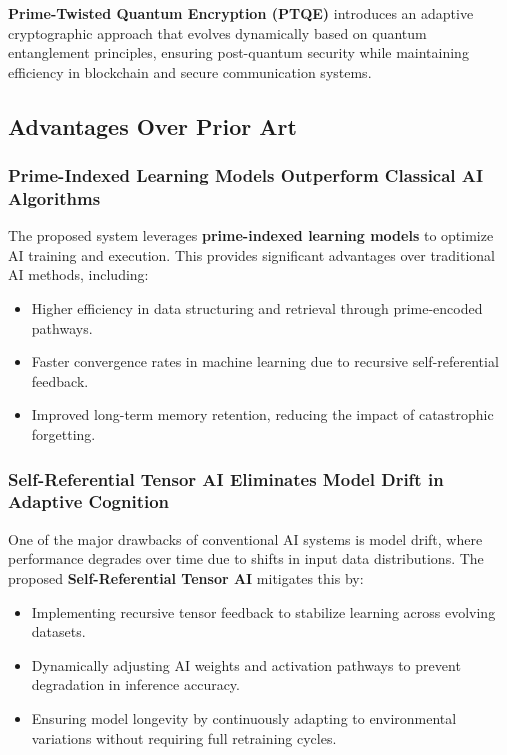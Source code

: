 \documentclass{article}
\theoremstyle{plain}
\begin{document}
\textbf{Prime-Twisted Quantum Encryption (PTQE)} introduces an adaptive cryptographic approach that evolves dynamically based on quantum entanglement principles, ensuring post-quantum security while maintaining efficiency in blockchain and secure communication systems.

\subsection{Advantages Over Prior Art}

\subsubsection{Prime-Indexed Learning Models Outperform Classical AI Algorithms}

The proposed system leverages \textbf{prime-indexed learning models} to optimize AI training and execution. This provides significant advantages over traditional AI methods, including:
\begin{itemize}
    \item Higher efficiency in data structuring and retrieval through prime-encoded pathways.
    \item Faster convergence rates in machine learning due to recursive self-referential feedback.
    \item Improved long-term memory retention, reducing the impact of catastrophic forgetting.
\end{itemize}

\subsubsection{Self-Referential Tensor AI Eliminates Model Drift in Adaptive Cognition}

One of the major drawbacks of conventional AI systems is model drift, where performance degrades over time due to shifts in input data distributions. The proposed \textbf{Self-Referential Tensor AI} mitigates this by:
\begin{itemize}
    \item Implementing recursive tensor feedback to stabilize learning across evolving datasets.
    \item Dynamically adjusting AI weights and activation pathways to prevent degradation in inference accuracy.
    \item Ensuring model longevity by continuously adapting to environmental variations without requiring full retraining cycles.
\end{itemize}
\end{document}

